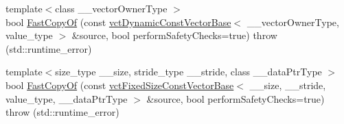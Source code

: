 {\bf }\par
\begin{DoxyCompactItemize}
\item 
{\footnotesize template$<$class \+\_\+\+\_\+vector\+Owner\+Type $>$ }\\bool \hyperlink{classvct_dynamic_vector_base_ad2bbab4a18c78a546aa5e182206f6edb}{Fast\+Copy\+Of} (const \hyperlink{classvct_dynamic_const_vector_base}{vct\+Dynamic\+Const\+Vector\+Base}$<$ \+\_\+\+\_\+vector\+Owner\+Type, value\+\_\+type $>$ \&source, bool perform\+Safety\+Checks=true)  throw (std\+::runtime\+\_\+error)
\item 
{\footnotesize template$<$size\+\_\+type \+\_\+\+\_\+size, stride\+\_\+type \+\_\+\+\_\+stride, class \+\_\+\+\_\+data\+Ptr\+Type $>$ }\\bool \hyperlink{classvct_dynamic_vector_base_a12155c8c505faf9e77a30a0d430f900f}{Fast\+Copy\+Of} (const \hyperlink{classvct_fixed_size_const_vector_base}{vct\+Fixed\+Size\+Const\+Vector\+Base}$<$ \+\_\+\+\_\+size, \+\_\+\+\_\+stride, value\+\_\+type, \+\_\+\+\_\+data\+Ptr\+Type $>$ \&source, bool perform\+Safety\+Checks=true)  throw (std\+::runtime\+\_\+error)
\end{DoxyCompactItemize}

